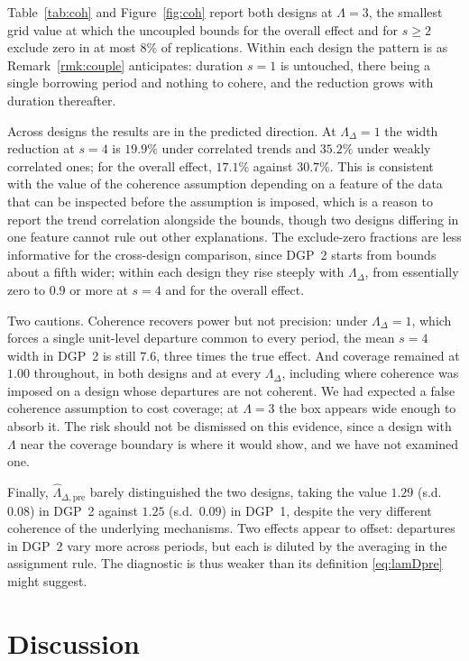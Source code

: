 \documentclass[12pt]{article}
\theoremstyle{remark}
\begin{document}
Table~\ref{tab:coh} and Figure~\ref{fig:coh} report both designs at $\Lambda = 3$, the
smallest grid value at which the uncoupled bounds for the overall effect and for
$s \ge 2$ exclude zero in at most $8\%$ of replications. Within each design the
pattern is as Remark~\ref{rmk:couple} anticipates: duration $s = 1$ is untouched, there
being a single borrowing period and nothing to cohere, and the reduction grows with
duration thereafter.

Across designs the results are in the predicted direction. At $\Lambda_\Delta = 1$ the
width reduction at $s = 4$ is $19.9\%$ under correlated trends and $35.2\%$ under weakly
correlated ones; for the overall effect, $17.1\%$ against $30.7\%$. This is consistent
with the value of the coherence assumption depending on a feature of the data that can be
inspected before the assumption is imposed, which is a reason to report the trend
correlation alongside the bounds, though two designs differing in one feature cannot rule
out other explanations. The exclude-zero fractions
are less informative for the cross-design comparison, since DGP~2 starts from bounds about
a fifth wider; within each design they rise steeply with $\Lambda_\Delta$, from essentially
zero to $0.9$ or more at $s = 4$ and for the overall effect.

Two cautions. Coherence recovers power but not precision: under $\Lambda_\Delta = 1$,
which forces a single unit-level departure common to every period, the mean $s = 4$ width
in DGP~2 is still $7.6$, three times the true effect. And coverage remained at $1.00$
throughout, in both designs and at every $\Lambda_\Delta$, including where coherence was
imposed on a design whose departures are not coherent. We had expected a false coherence assumption to cost
coverage; at $\Lambda = 3$ the box appears wide enough to absorb it. The risk should not
be dismissed on this evidence, since a design with $\Lambda$ near the coverage boundary is
where it would show, and we have not examined one.

Finally, $\widehat\Lambda_{\Delta,\mathrm{pre}}$ barely distinguished the two designs,
taking the value $1.29$ (s.d.\ $0.08$) in DGP~2 against $1.25$ (s.d.\ $0.09$) in DGP~1,
despite the very different coherence of the underlying mechanisms. Two effects appear to
offset: departures in DGP~2 vary more across periods, but each is diluted by the averaging
in the assignment rule. The diagnostic is thus weaker than its definition \eqref{eq:lamDpre}
might suggest.

\section{Discussion}
\label{sec:disc}
\end{document}
